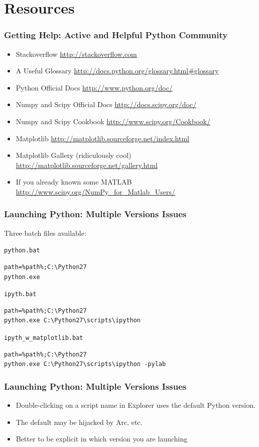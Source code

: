 \documentclass{beamer}
\begin{document}
\section[]{Resources}
\begin{frame}[fragile]
\frametitle{Getting Help: Active and Helpful Python Community}
\begin{itemize}
\item Stackoverflow \url{http://stackoverflow.com}
\pause
\item A Useful Glossary \url{http://docs.python.org/glossary.html#glossary}
\pause
\item Python Official Docs \url{http://www.python.org/doc/}
\item Numpy and Scipy Official Docs \url{http://docs.scipy.org/doc/}
\pause
\item Numpy and Scipy Cookbook \url{http://www.scipy.org/Cookbook/}
\pause
\item Matplotlib \url{http://matplotlib.sourceforge.net/index.html}
\item Matplotlib Gallery (ridiculously cool) \url{http://matplotlib.sourceforge.net/gallery.html}
\pause
\item If you already known some MATLAB \url{http://www.scipy.org/NumPy_for_Matlab_Users/}
\end{itemize}
\end{frame}

\begin{frame}[fragile]
\frametitle{Launching Python: Multiple Versions Issues}
Three batch files available:\\
\begin{small}
\texttt{python.bat}
\begin{Verbatim}[frame=single]
path=%path%;C:\Python27
python.exe
\end{Verbatim}

\texttt{ipyth.bat}
\begin{Verbatim}[frame=single]
path=%path%;C:\Python27
python.exe C:\Python27\scripts\ipython
\end{Verbatim}

\texttt{ipyth\_w\_matplotlib.bat}
\begin{Verbatim}[frame=single]
path=%path%;C:\Python27
python.exe C:\Python27\scripts\ipython -pylab
\end{Verbatim}
\end{small}
\end{frame}

\begin{frame}[fragile]
\frametitle{Launching Python: Multiple Versions Issues}
\begin{itemize}
\item Double-clicking on a script name in Explorer uses the default Python version.
\item The default may be hijacked by Arc, etc.
\item Better to be explicit in which version you are launching

\end{itemize}
\end{frame}
\end{document}
